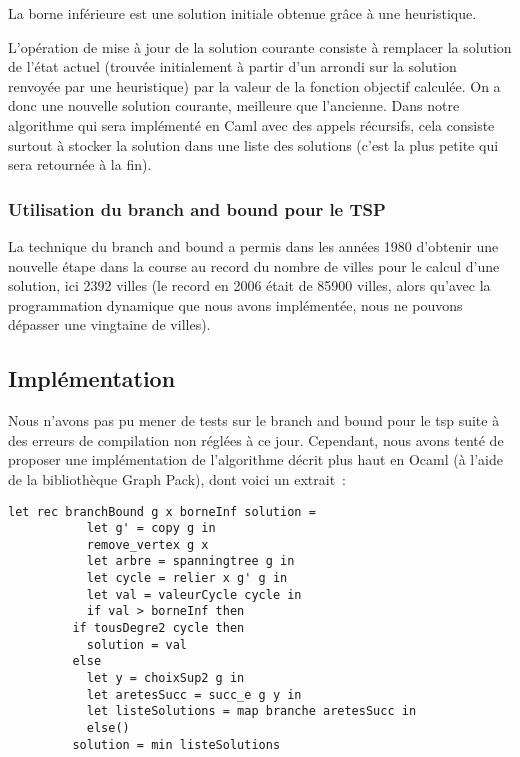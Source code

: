 La borne inférieure est une solution initiale obtenue grâce à une
heuristique.

L'opération de mise à jour de la solution courante consiste à
remplacer la solution de l'état actuel (trouvée initialement à partir
d'un arrondi sur la solution renvoyée par une heuristique) par la
valeur de la fonction objectif calculée. On a donc une nouvelle
solution courante, meilleure que l'ancienne. Dans notre algorithme qui
sera implémenté en Caml avec des appels récursifs, cela consiste
surtout à stocker la solution dans une liste des solutions (c'est la
plus petite qui sera retournée à la fin).

\subsubsection{Utilisation du branch and bound pour le TSP}

La technique du branch and bound a permis dans les années 1980
d'obtenir une nouvelle étape dans la course au record du nombre de
villes pour le calcul d'une solution, ici 2392 villes (le record en
2006 était de 85900 villes, alors qu'avec la programmation dynamique
que nous avons implémentée, nous ne pouvons dépasser une vingtaine de
villes).

\subsection{Implémentation}

Nous n'avons pas pu mener de tests sur le branch and bound pour le tsp
suite à des erreurs de compilation non réglées à ce jour. Cependant,
nous avons tenté de proposer une implémentation de l'algorithme décrit plus haut
en Ocaml (à l'aide de la bibliothèque Graph Pack), dont voici un extrait~:
\begin{lstlisting}
let rec branchBound g x borneInf solution = 
	       let g' = copy g in
	       remove_vertex g x
	       let arbre = spanningtree g in
	       let cycle = relier x g' g in 
	       let val = valeurCycle cycle in
	       if val > borneInf then 
		 if tousDegre2 cycle then
		   solution = val
		 else
		   let y = choixSup2 g in
		   let aretesSucc = succ_e g y in 
		   let listeSolutions = map branche aretesSucc in
	       else()
		 solution = min listeSolutions
\end{lstlisting}

